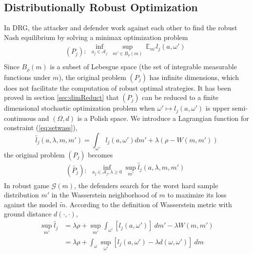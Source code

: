 \documentclass{article}
\begin{document}
\subsection{Distributionally Robust Optimization}
In DRG,
the attacker and defender work against each other to find the robust Nash equilibrium by solving a minimax optimization problem
\begin{equation*}(P_j):
\begin{array}{l}
\inf_{a_j\in \mathcal{A}_j} \ \sup_{m' \in B_{\rho}(m)}\ \mathbb{E}_{m'} l_j(a,\omega') \\
\end{array}
\end{equation*}
Since $B_\rho(m)$ is a subset of Lebesgue space (the set of integrable measurable functions under $m$), the original problem $(P_j)$ has infinite dimensions, which does not facilitate the computation of robust optimal strategies. It has been proved in section \ref{sec:dimReduct} that $(P_j)$ can be reduced to a finite dimensional stochastic optimization problem when $\omega' \mapsto l_j(a,\omega')$ is upper semi-continuous and $(\Omega, d)$ is a Polish space. We introduce a Lagrangian function for constraint (\ref{eq:setwass}),
\begin{equation}
\tilde{l_j}(a,\lambda, m,m') = \int_{\omega'} l_j(a,\omega') dm' + \lambda(\rho - W(m,m'))
\end{equation}
the original problem $(P_j)$ becomes
\begin{equation}\label{eq:Pj*}(\tilde{P_j}):
\begin{array}{l}
\inf_{a_j\in \mathcal{A}_j, \lambda \geq 0} \sup_{m'}\tilde{l_j}(a,\lambda,m,m') \\
\end{array}
\end{equation}
In robust game $\mathcal{G}(m)$, the defenders search for the worst hard sample distribution $m'$ in the Wasserstein neighborhood of $m$ to maximize its loss against the model $\tilde{m}$. According to the definition of Wasserstein metric with ground distance $d(\cdot,\cdot)$,
\begin{equation}
\begin{aligned}
\sup_{m'} \tilde{l_j} &= \lambda \rho + \sup_{m'} \int_{\omega'} [l_j(a,\omega')] \ dm' - \lambda W(m,m') \\
&= \lambda \rho + \int_\omega \sup_{\omega'} [l_j(a,\omega') - \lambda d(\omega, \omega')] \ dm
\end{aligned}
\end{equation}
\end{document}
